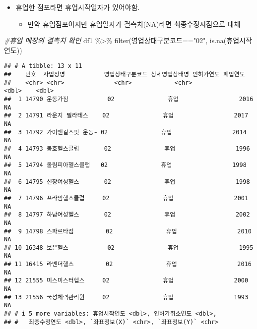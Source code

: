 \documentclass[
]{book}
\newenvironment{Shaded}{\begin{snugshade}}{\end{snugshade}}
\newcommand{\CommentTok}[1]{\textcolor[rgb]{0.56,0.35,0.01}{\textit{#1}}}
\newcommand{\FunctionTok}[1]{\textcolor[rgb]{0.00,0.00,0.00}{#1}}
\newcommand{\NormalTok}[1]{#1}
\newcommand{\SpecialCharTok}[1]{\textcolor[rgb]{0.00,0.00,0.00}{#1}}
\newcommand{\StringTok}[1]{\textcolor[rgb]{0.31,0.60,0.02}{#1}}
\providecommand{\tightlist}{%
  \setlength{\itemsep}{0pt}\setlength{\parskip}{0pt}}
\begin{document}
\begin{itemize}
\item
  휴업한 점포라면 휴업시작일자가 있어야함.

  \begin{itemize}
  \tightlist
  \item
    만약 휴업점포이지만 휴업일자가 결측치(NA)라면 최종수정시점으로 대체
  \end{itemize}
\end{itemize}

\begin{Shaded}
\begin{Highlighting}[]
\CommentTok{\#휴업 매장의 결측치 확인}
\NormalTok{df1 }\SpecialCharTok{\%\textgreater{}\%} 
  \FunctionTok{filter}\NormalTok{(영업상태구분코드}\SpecialCharTok{==}\StringTok{"02"}\NormalTok{, }\FunctionTok{is.na}\NormalTok{(휴업시작연도))}
\end{Highlighting}
\end{Shaded}

\begin{verbatim}
## # A tibble: 13 x 11
##    번호  사업장명           영업상태구분코드 상세영업상태명 인허가연도 폐업연도
##    <chr> <chr>              <chr>            <chr>               <dbl>    <dbl>
##  1 14790 운동가짐           02               휴업                 2016       NA
##  2 14791 라운지 필라테스    02               휴업                 2017       NA
##  3 14792 가이앤걸스핏 운동~ 02               휴업                 2014       NA
##  4 14793 동호헬스클럽       02               휴업                 1996       NA
##  5 14794 올림피아헬스클럽   02               휴업                 1998       NA
##  6 14795 신장여성헬스       02               휴업                 1998       NA
##  7 14796 프라임헬스클럽     02               휴업                 2001       NA
##  8 14797 하남여성헬스       02               휴업                 2002       NA
##  9 14798 스파르타짐         02               휴업                 2010       NA
## 10 16348 보은헬스           02               휴업                 1995       NA
## 11 16415 라벤더헬스         02               휴업                 2016       NA
## 12 21555 미스미스터헬스     02               휴업                 2000       NA
## 13 21556 국성체력관리원     02               휴업                 1993       NA
## # i 5 more variables: 휴업시작연도 <dbl>, 인허가취소연도 <dbl>,
## #   최종수정연도 <dbl>, `좌표정보(X)` <chr>, `좌표정보(Y)` <chr>
\end{verbatim}
\end{document}
